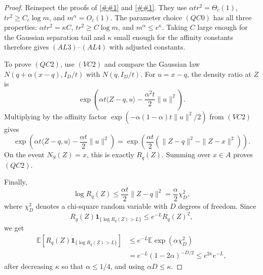 \documentclass[10pt]{article}
\newcommand{\cref}[1]{\ref{##1}}
\theoremstyle{definition}
\newcommand{\E}{\mathbb{E}}
\begin{document}
\begin{proof}
   Reinspect the proofs of \cref{thm:continuous-likelihood-balls} and
   \cref{lem:scale-amplified-alpha-leader}.  They use
   \(\alpha t r^2=\Theta_c(1)\), \(t r^2\ge C_c\log m\), and
   \(m^\alpha=O_c(1)\).  The parameter choice \((QC0)\) has all three
   properties: \(\alpha t r^2=\kappa C\),
   \(t r^2\ge C\log m\), and \(m^\alpha\le e^\kappa\).  Taking \(C\) large
   enough for the Gaussian separation tail and \(\kappa\) small enough for the
   affinity constants therefore gives \((AL3)\)--\((AL4)\) with adjusted
   constants.

   To prove \((QC2)\), use \((VC2)\) and compare the Gaussian law
   \(N(q+\alpha(x-q),I_D/t)\) with \(N(q,I_D/t)\).  For
   \(u=x-q\), the density ratio at \(Z\) is
   \[
      \exp\!\left(
         \alpha t\langle Z-q,u\rangle
         -\frac{\alpha^2t}{2}\|u\|^2
      \right).
   \]
   Multiplying by the affinity factor
   \(\exp(-\alpha(1-\alpha)t\|u\|^2/2)\) from \((VC2)\) gives
   \[
      \exp\!\left(
         \alpha t\langle Z-q,u\rangle
         -\frac{\alpha t}{2}\|u\|^2
      \right)
      =
      \exp\!\left(
         \frac{\alpha t}{2}
         (\|Z-q\|^2-\|Z-x\|^2)
      \right).
   \]
   On the event \(N_S(Z)=x\), this is exactly \(R_q(Z)\).  Summing over
   \(x\in A\) proves \((QC2)\).

   Finally,
   \[
      \log R_q(Z)
      \le
      \frac{\alpha t}{2}\|Z-q\|^2
      =
      \frac{\alpha}{2}\chi_D^2 ,
   \]
   where \(\chi_D^2\) denotes a chi-square random variable with \(D\) degrees
   of freedom.  Since
   \[
      R_q(Z)\mathbf 1_{\{\log R_q(Z)>L\}}
      \le e^{-L}R_q(Z)^2 ,
   \]
   we get
   \[
   \begin{aligned}
      \E\left[R_q(Z)\mathbf 1_{\{\log R_q(Z)>L\}}\right]
      &\le
      e^{-L}
      \E\exp\!\left(\alpha\chi_D^2\right)\\
      &=
      e^{-L}(1-2\alpha)^{-D/2}
      \le
      e^{2\kappa}e^{-L},
   \end{aligned}
   \]
   after decreasing \(\kappa\) so that \(\alpha\le1/4\), and using
   \(\alpha D\le\kappa\).
\end{proof}
\end{document}
